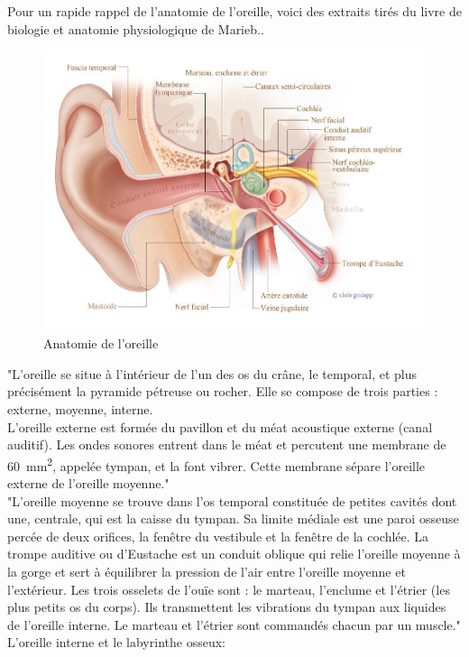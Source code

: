 Pour un rapide rappel de l'anatomie de l'oreille, voici des extraits tirés du livre de biologie et anatomie
physiologique de  Marieb.\autocite {marieb:biologie}. 
\begin{figure}
	\centering
	\includegraphics[width=0.7\linewidth]{images/20160624Berufsfeldgruppen.jpg}
	\caption[Anatomie oreille]{Anatomie de l'oreille}
	\label{fig:-20160624berufsfeldgruppen}
\end{figure}
"L'oreille
se situe à l'intérieur de l'un des os du crâne, le temporal, et plus précisément la pyramide pétreuse ou 
rocher. Elle se compose de trois parties : externe, moyenne, interne.
\\
L'oreille externe  
est formée du pavillon et du méat acoustique externe
	(canal auditif). Les ondes sonores entrent dans le méat et percutent
	une membrane de \SI{60}{\milli\metre\squared}, appelée tympan, et la font vibrer.
	Cette membrane
	sépare l'oreille externe de l'oreille moyenne."\autocite[ 319--321.]{marieb:biologie}
	\\
"L'oreille moyenne se trouve dans l'os temporal constituée de petites
cavités dont une, centrale, qui est la caisse du tympan. Sa limite
médiale est une paroi osseuse percée de deux orifices, la fenêtre
du vestibule et la fenêtre de la cochlée. La trompe auditive ou d'Eustache
est un conduit oblique qui relie l'oreille moyenne à la gorge et sert
à équilibrer la pression de l'air entre l'oreille moyenne et l'extérieur.
Les trois osselets de l'ouïe sont : le marteau, l'enclume et l'étrier
(les plus petits os du corps). Ils transmettent les vibrations du
tympan aux liquides de l'oreille interne.
Le marteau et l'étrier sont commandés chacun par un muscle."\autocite[319--321.]{marieb:biologie}
\\
L'oreille interne et le labyrinthe osseux:

